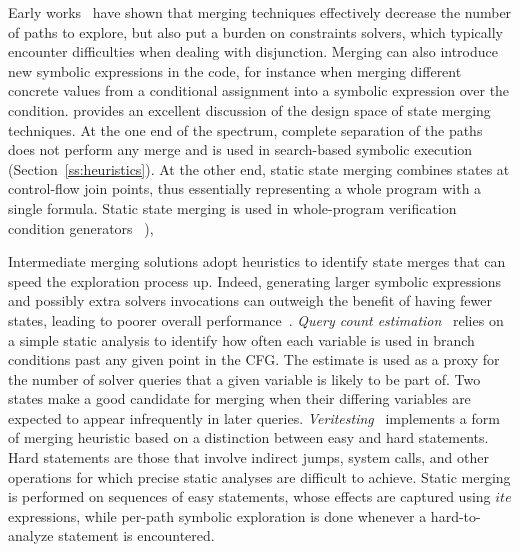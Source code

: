 Early works~\cite{G-POPL07,HSS-RV09} have shown that merging techniques effectively decrease the number of paths to explore, but also put a burden on constraints solvers, which typically encounter difficulties when dealing with disjunction. Merging can also introduce new symbolic expressions in the code, for instance when merging different concrete values from a conditional assignment into a symbolic expression over the condition. \cite{KKB-PLDI12} provides an excellent discussion of the design space of state merging techniques. At the one end of the spectrum, complete separation of the paths does not perform any merge and is used in search-based symbolic execution (Section~\ref{ss:heuristics}). At the other end, static state merging combines states at control-flow join points, thus essentially representing a whole program with a single formula. Static state merging is used in whole-program verification condition generators ~\cite{SATURN-POPL05,CALYSTO-ICSE08}), 



 Intermediate merging solutions adopt heuristics to identify state merges that can speed the exploration process up. Indeed, generating larger symbolic expressions and possibly extra solvers invocations can outweigh the benefit of having fewer states, leading to poorer overall performance~\cite{HSS-RV09,KKB-PLDI12}. {\em Query count estimation}~\cite{KKB-PLDI12} relies on a simple static analysis to identify how often each variable is used in branch conditions past any given point in the CFG. The estimate is used as a proxy for the number of solver queries that a given variable is likely to be part of. Two states make a good candidate for merging when their differing variables are expected to appear infrequently in later queries. {\em Veritesting}~\cite{VERITESTING-ICSE14} implements a form of merging heuristic based on a distinction between easy and hard statements. Hard statements are those that involve indirect jumps, system calls, and other operations for which precise static analyses are difficult to achieve. Static merging is performed on sequences of easy statements, %
whose effects are captured using $ite$ expressions, 
while per-path symbolic exploration is done whenever a hard-to-analyze statement is encountered. 

